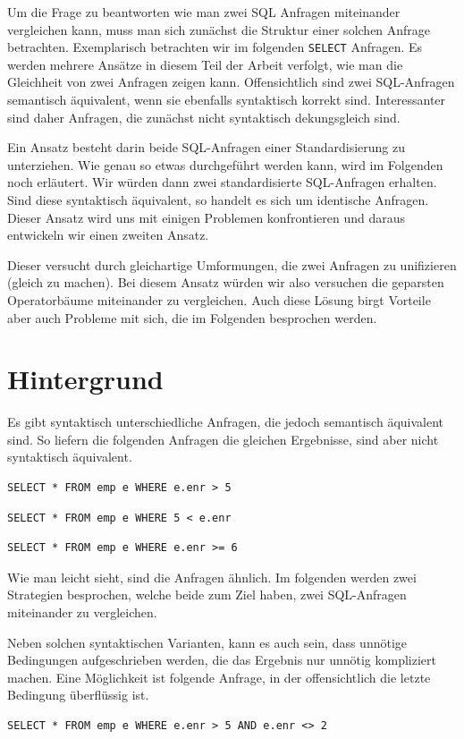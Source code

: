 Um die Frage zu beantworten wie man zwei SQL Anfragen miteinander vergleichen kann, muss man sich zunächst die Struktur einer solchen Anfrage betrachten. Exemplarisch betrachten wir im folgenden \verb|SELECT| Anfragen. Es werden mehrere Ansätze in diesem Teil der Arbeit verfolgt, wie man die Gleichheit von zwei Anfragen zeigen kann. Offensichtlich sind zwei SQL-Anfragen semantisch äquivalent, wenn sie ebenfalls syntaktisch korrekt sind. Interessanter sind daher Anfragen, die zunächst nicht syntaktisch dekungsgleich sind. 

Ein Ansatz besteht darin beide SQL-Anfragen einer Standardisierung zu unterziehen. Wie genau so etwas durchgeführt werden kann, wird im Folgenden noch erläutert. Wir würden dann zwei standardisierte SQL-Anfragen erhalten. Sind diese syntaktisch äquivalent, so handelt es sich um identische Anfragen. Dieser Ansatz wird uns mit einigen Problemen konfrontieren und daraus entwickeln wir einen zweiten Ansatz. 

Dieser versucht durch gleichartige Umformungen, die zwei Anfragen zu unifizieren (gleich zu machen). Bei diesem Ansatz würden wir also versuchen die geparsten Operatorbäume miteinander zu vergleichen. Auch diese Lösung birgt Vorteile aber auch Probleme mit sich, die im Folgenden besprochen werden.

\section{Hintergrund}

Es gibt syntaktisch unterschiedliche Anfragen, die jedoch semantisch äquivalent sind. So liefern die folgenden Anfragen die gleichen Ergebnisse, sind aber nicht syntaktisch äquivalent.

\begin{verbatim}
SELECT * FROM emp e WHERE e.enr > 5
\end{verbatim}

\begin{verbatim}
SELECT * FROM emp e WHERE 5 < e.enr
\end{verbatim}

\begin{verbatim}
SELECT * FROM emp e WHERE e.enr >= 6
\end{verbatim}

Wie man leicht sieht, sind die Anfragen ähnlich. Im folgenden werden zwei Strategien besprochen, welche beide zum Ziel haben, zwei SQL-Anfragen miteinander zu vergleichen.

Neben solchen syntaktischen Varianten, kann es auch sein, dass unnötige Bedingungen aufgeschrieben werden, die das Ergebnis nur unnötig kompliziert machen. Eine Möglichkeit ist folgende Anfrage, in der offensichtlich die letzte Bedingung überflüssig ist.
\begin{verbatim}
SELECT * FROM emp e WHERE e.enr > 5 AND e.enr <> 2
\end{verbatim}

